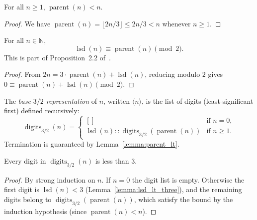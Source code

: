 \begin{lemma}\label{lemma:parent_lt}\leanok
For all $n \ge 1$, $\operatorname{parent}(n) < n$.
\end{lemma}
\begin{proof}\leanok
We have $\operatorname{parent}(n) = \lfloor 2n/3 \rfloor \le 2n/3 < n$ whenever $n \ge 1$.
\end{proof}

\begin{lemma}\label{lemma:lsd_mod_two_eq_parent}\leanok
For all $n \in \mathbb{N}$,
\[
  \operatorname{lsd}(n) \equiv \operatorname{parent}(n) \pmod{2}.
\]
This is part of Proposition~2.2 of~\cite{eli25}.
\end{lemma}
\begin{proof}\leanok
From $2n = 3 \cdot \operatorname{parent}(n) + \operatorname{lsd}(n)$, reducing modulo $2$
gives $0 \equiv \operatorname{parent}(n) + \operatorname{lsd}(n) \pmod{2}$.
\end{proof}


\begin{definition}\label{def:digits32}\leanok
The \emph{base-$3/2$ representation} of $n$, written $\langle n \rangle$,
is the list of digits (least-significant first) defined recursively:
\[
  \operatorname{digits}_{3/2}(n) =
  \begin{cases}
    [] & \text{if } n = 0, \\
    \operatorname{lsd}(n) :: \operatorname{digits}_{3/2}(\operatorname{parent}(n)) & \text{if } n \ge 1.
  \end{cases}
\]
Termination is guaranteed by Lemma~\ref{lemma:parent_lt}.
\end{definition}

\begin{lemma}\label{lemma:mem_digits32_lt_three}\leanok
Every digit in $\operatorname{digits}_{3/2}(n)$ is less than $3$.
\end{lemma}
\begin{proof}\leanok
By strong induction on $n$.  If $n = 0$ the digit list is empty.
Otherwise the first digit is $\operatorname{lsd}(n) < 3$
(Lemma~\ref{lemma:lsd_lt_three}), and the remaining digits belong to
$\operatorname{digits}_{3/2}(\operatorname{parent}(n))$, which satisfy
the bound by the induction hypothesis (since $\operatorname{parent}(n) < n$).
\end{proof}

